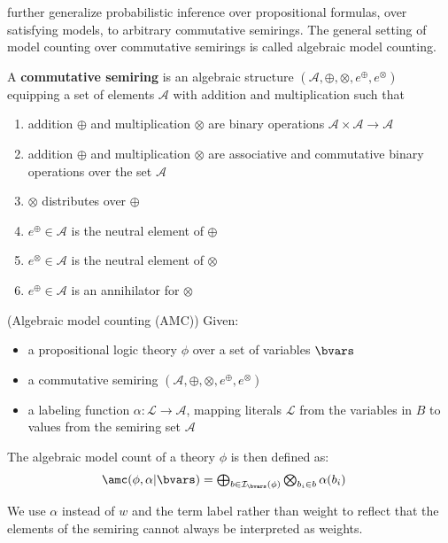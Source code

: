 \citet{kimmig2017algebraic} further generalize probabilistic inference over propositional formulas, \ie over satisfying models, to arbitrary commutative semirings. The general setting of model counting over commutative semirings is called algebraic model counting.
\begin{definition}\label{def:comm_semiring} 
	A {\bf  commutative semiring} is an algebraic structure $(\mathcal{A},\oplus,\otimes,\allowbreak e^{\oplus},e^\otimes)$ equipping a set of elements $\mathcal{A}$ with addition and multiplication such that
	\begin{enumerate}
		\item addition $\oplus$ and multiplication $\otimes$ are binary operations $\mathcal{A}\times \mathcal{A}\rightarrow \mathcal{A}$
		\item addition $\oplus$ and multiplication $\otimes$ are  associative and commutative binary operations over the set $\mathcal{A}$
		\item $\otimes$ distributes over $\oplus$
		\item  $e^\oplus \in \mathcal{A}$ is the neutral element of $\oplus$
		\item  $e^\otimes \in \mathcal{A}$ is the neutral element of $\otimes$
		\item $e^\oplus \in \mathcal{A}$ is an annihilator for $\otimes$
	\end{enumerate}
\end{definition}







\begin{definition}\label{def:amc} (Algebraic model counting (AMC)) \citep{kimmig2017algebraic} Given:
	\begin{itemize}
		\item a propositional logic theory $\phi$ over a set of variables $\bvars$
		\item a commutative semiring $(\mathcal{A},\oplus,\otimes,e^{\oplus},e^\otimes)$
		\item a labeling function $\alpha:\mathcal{L}\rightarrow \mathcal{A}$, mapping literals $\mathcal{L}$ from the variables in $B$ to values from the semiring set $\mathcal{A}$
	\end{itemize} 
	The algebraic model count of a theory $\phi$ is then defined as:
	\begin{align}
	\textstyle \amc(\phi,\alpha | \bvars) = \bigoplus_{b \in \mathcal{I}_\bvars(\phi)} \bigotimes_{b_i \in b} \alpha (b_i)&  \nonumber
	\end{align}
\end{definition}
We use $\alpha$ instead of $w$ and the term label rather than weight to reflect that the elements of the semiring cannot always be interpreted as weights.

